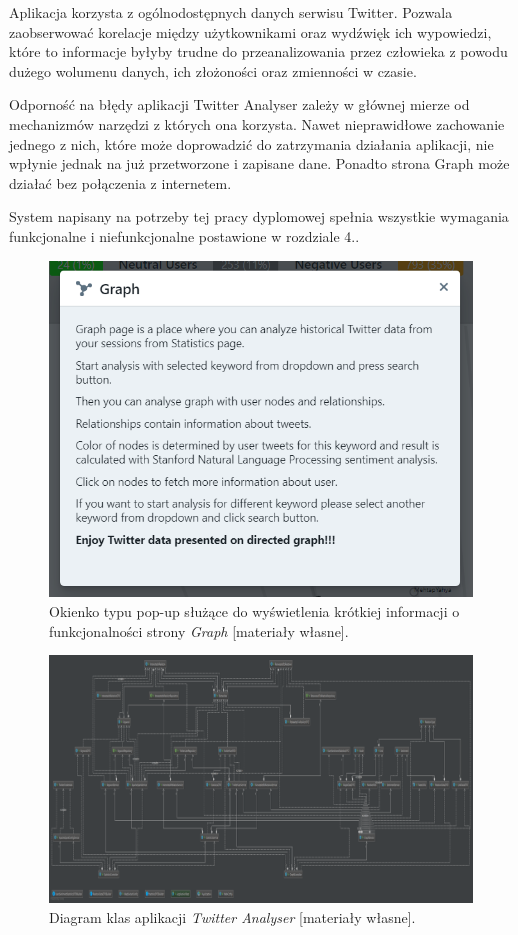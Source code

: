 Aplikacja korzysta z ogólnodostępnych danych serwisu Twitter. Pozwala zaobserwować korelacje między użytkownikami oraz wydźwięk ich wypowiedzi, które to informacje byłyby trudne do przeanalizowania przez człowieka z powodu dużego wolumenu danych, ich złożoności oraz zmienności w czasie.

Odporność na błędy aplikacji Twitter Analyser zależy w głównej mierze od mechanizmów narzędzi z których ona korzysta. Nawet nieprawidłowe zachowanie jednego z nich, które może doprowadzić do zatrzymania działania aplikacji, nie wpłynie jednak na już przetworzone i zapisane dane. Ponadto strona Graph może działać bez połączenia z internetem.

System napisany na potrzeby tej pracy dyplomowej spełnia wszystkie wymagania funkcjonalne i niefunkcjonalne postawione w rozdziale 4..

\begin{figure}[h] %
	\centering
	\includegraphics[width=0.6\linewidth]{img/twitter_analyser_help}
	\caption{Okienko typu pop-up służące do wyświetlenia krótkiej informacji o funkcjonalności strony \textit{Graph} [materiały własne].}
\end{figure}

\begin{figure}[h] %
	\centering
	\includegraphics[width=1.5\linewidth, angle=90]{img/twitter_analyser_class_diagram}
	\caption{Diagram klas aplikacji \textit{Twitter Analyser} [materiały własne].}
\end{figure}



